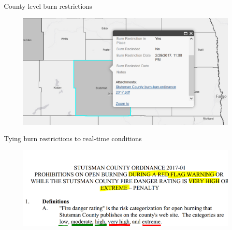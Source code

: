 \documentclass[11pt]{beamer}
\begin{document}
\begin{frame}{County-level burn restrictions}
	\begin{center}
		\begin{figure}
			\includegraphics[width=1\linewidth]{figs/StutsmanBurnBan} 
		\end{figure}
	\end{center}
\end{frame}

\begin{frame}{Tying burn restrictions to real-time conditions}
	\begin{center}
		\begin{figure}
			\includegraphics[width=1\linewidth]{figs/StutsmanOrdinance} 
		\end{figure}
	\end{center}
\end{frame}
\end{document}
